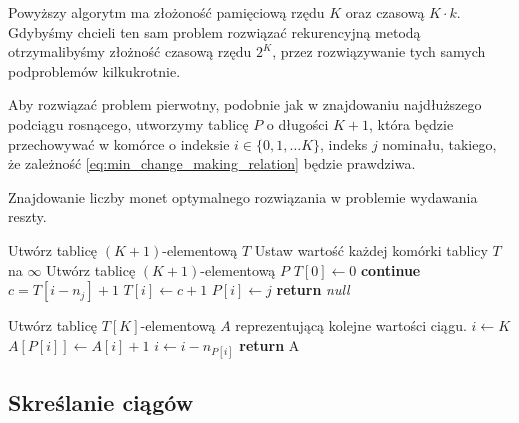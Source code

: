Powyższy algorytm ma złożoność pamięciową rzędu $K$ oraz czasową $K\cdot k$. 
Gdybyśmy chcieli ten sam problem rozwiązać rekurencyjną metodą otrzymalibyśmy
złożność czasową rzędu $2^K$, przez rozwiązywanie tych samych podproblemów kilkukrotnie.

Aby rozwiązać problem pierwotny, podobnie jak w znajdowaniu najdłuższego
podciągu rosnącego, utworzymy tablicę $P$ o długości $K+1$,
która będzie przechowywać w komórce o indeksie $i \in \{0, 1, \ldots K\}$, indeks $j$
nominału, takiego, że zależność \eqref{eq:min_change_making_relation}
będzie prawdziwa.

\begin{algorithm}[H]
	\caption{Znajdowanie liczby monet optymalnego 
		rozwiązania w problemie wydawania reszty.}\label{ChangeMaking}
	\begin{algorithmic}[1]
		\State Utwórz tablicę $(K+1)$-elementową $T$
		\State Ustaw wartość każdej komórki tablicy $T$ na $\infty$
		\State Utwórz tablicę $(K+1)$-elementową $P$
		\State $T[0] \gets 0$
		 \textbf{continue}
		\EndIf
		\State $c = T[i - n_j] + 1$
		\State $T[i] \gets c + 1$
		\State $P[i] \gets j$
		\EndIf
		\EndFor
		\EndFor
		 \textbf{return} \textit{null}
		\EndIf
		
		\State Utwórz tablicę $T[K]$-elementową $A$ reprezentującą
		kolejne wartości ciągu.
		\State $i \gets K$
		\State $A[P[i]] \gets A[i] + 1$
		\State $i \gets i - n_{P[i]}$
		\EndWhile
		\State \textbf{return} A
		\EndProcedure
	\end{algorithmic}
\end{algorithm}

\subsection{Skreślanie ciągów}